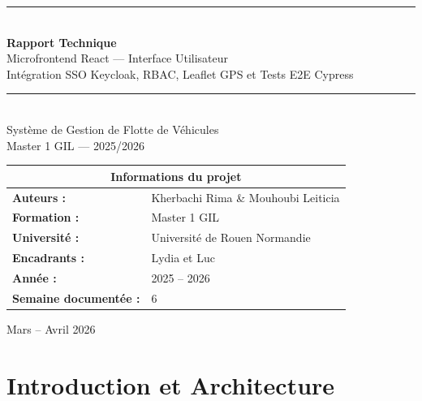\documentclass[12pt,a4paper]{report}
\begin{document}
\thispagestyle{empty}

\begin{titlepage}
  \centering
  \vspace*{2cm}

  \rule{\linewidth}{1.5pt}\\[0.4cm]
  {\Huge\bfseries Rapport Technique}\\[0.3cm]
  {\Large\color{titleblue} Microfrontend React — Interface Utilisateur}\\[0.2cm]
  {\normalsize Intégration SSO Keycloak, RBAC, Leaflet GPS et Tests E2E Cypress}\\[0.1cm]
  \rule{\linewidth}{1.5pt}\\[1.5cm]

  {\Large Système de Gestion de Flotte de Véhicules}\\[0.5cm]
  {\large Master 1 GIL — 2025/2026}\\[2cm]

  \begin{minipage}{0.6\textwidth}
    \begin{tabular}{|l l|}
      \hline
      \multicolumn{2}{|c|}{\textbf{Informations du projet}} \\
      \hline
      \textbf{Auteurs :}            & Kherbachi Rima \& Mouhoubi Leiticia \\
      \textbf{Formation :}          & Master 1 GIL \\
      \textbf{Université :}         & Université de Rouen Normandie \\
      \textbf{Encadrants :}         & Lydia et Luc \\
      \textbf{Année :}              & 2025 – 2026 \\
      \textbf{Semaine documentée :} & 6 \\
      \hline
    \end{tabular}
  \end{minipage}

  \vfill
  {\large Mars – Avril 2026}
\end{titlepage}

\newpage
\tableofcontents
\newpage

\chapter{Introduction et Architecture}
\end{document}
